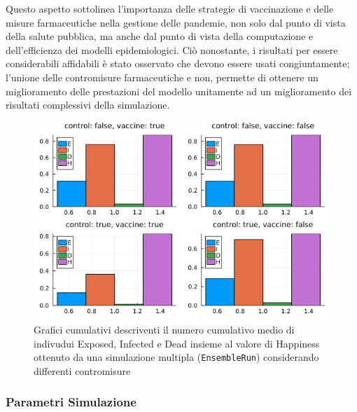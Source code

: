Questo aspetto sottolinea l'importanza delle strategie di vaccinazione 
e delle misure farmaceutiche nella gestione delle pandemie, 
non solo dal punto di vista della salute pubblica, ma anche dal punto 
di vista della computazione e dell'efficienza dei modelli epidemiologici.  Ciò nonostante, i risultati per essere considerabili affidabili è stato osservato che devono essere usati congiuntamente; l'unione delle contromisure farmaceutiche e non, permette di ottenere un miglioramento delle prestazioni del modello unitamente ad un miglioramento dei risultati complessivi della simulazione.

\begin{figure}[H]
    \begin{center}
		\includegraphics[width=\textwidth]{img/reduction_comparison.png}
		\caption{Grafici cumulativi descriventi il numero cumulativo medio di indivudui Exposed, Infected e Dead insieme al valore di Happiness ottenuto da una simulazione multipla (\texttt{EnsembleRun}) considerando differenti contromisure}
		\label{fig:reduction_comparison}
	\end{center}
\end{figure}

\subsubsection*{Parametri Simulazione}

